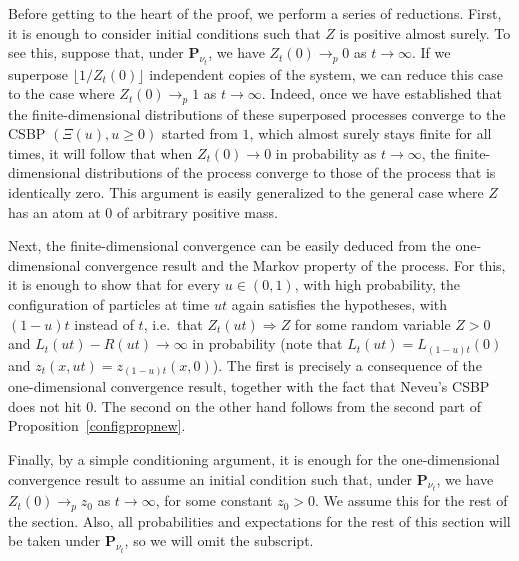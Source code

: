 \documentclass[AHL,Unicode,longabstracts,published]{cedram}
\renewcommand*\P{\mathbf{P}}
\newcommand{\1} {\mathds{1}}
\renewcommand*\to{\rightarrow}
\begin{document}
Before getting to the heart of the proof, we perform a series of reductions. First, it is enough to consider initial conditions such that $Z$ is positive almost surely. To see this, suppose that, under $\P_{\nu_t}$, we have $Z_t(0)\to_p 0$ as $t\to\infty$. If we superpose $\lfloor 1/Z_t(0)\rfloor$ independent copies of the system, we can reduce this case to the case where $Z_t(0)\to_p 1$ as $t\to\infty$. Indeed, once we have established that the finite-dimensional distributions of these superposed processes converge to the CSBP $(\Xi(u), u \geq 0)$ started from $1$, which almost surely stays finite for all times, it will follow that when $Z_t(0)\to0$ in probability as $t\to\infty$, the finite-dimensional distributions of the process converge to those of the process that is identically zero. This argument is easily generalized to the general case where $Z$ has an atom at $0$ of arbitrary positive mass.

Next, the finite-dimensional convergence can be easily deduced from the one-dimensional convergence result and the Markov property of the process. For this, it is enough to show that for every $u\in (0,1)$, with high probability, the configuration of particles at time $ut$ again satisfies the hypotheses, with $(1-u)t$ instead of $t$, i.e.~that $Z_t(ut) \Rightarrow Z$ for some random variable $Z>0$ and $L_t(ut) - R(ut) \to \infty$ in probability (note that $L_t(ut) = L_{(1-u)t}(0)$ and $z_t(x,ut) = z_{(1-u)t}(x,0)$). The first is precisely a consequence of the one-dimensional convergence result, together with the fact that Neveu's CSBP does not hit 0. The second on the other hand follows from the second part of Proposition~\ref{configpropnew}.

Finally, by a simple conditioning argument, it is enough for the one-dimensional convergence result to assume an initial condition such that, under $\P_{\nu_t}$, we have $Z_t(0) \to_p z_0$ as $t\to\infty$, for some constant $z_0>0$. We assume this for the rest of the section. Also, all probabilities and expectations for the rest of this section will be taken under $\P_{\nu_t}$, so we will omit the subscript.
\end{document}
